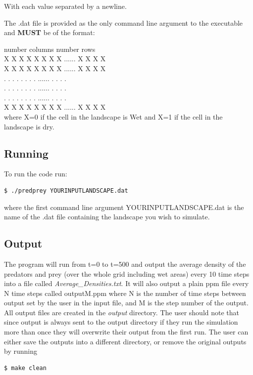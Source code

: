 With each value separated by a newline.

The .dat file is provided as the only command line argument to the executable and \textbf{MUST} be of the format:

number columns number rows      \\
X X X X X X X X ...... X X X X  \\
X X X X X X X X ...... X X X X  \\
. . . . . . . . ...... . . . .  \\
. . . . . . . . ...... . . . .  \\
. . . . . . . . ...... . . . .  \\
X X X X X X X X ...... X X X X  \\

where X=0 if the cell in the landscape is Wet and X=1 if the cell in the landscape is dry. 


\subsection{Running}
To run the code run:
\begin{lstlisting}[language=bash]
$ ./predprey YOURINPUTLANDSCAPE.dat

\end{lstlisting}
where the first command line argument YOURINPUTLANDSCAPE.dat is the name of the .dat file containing the landscape you wish to simulate. 

\subsection{Output}
The program will run from t=0 to t=500 and output the average density of the predators and prey (over the whole grid including wet areas) every 10 time steps into a file called \textit{Average\_Densities.txt}. It will also output a plain ppm file every N time steps called outputM.ppm where N is the number of time steps between output set by the user in the input file, and M is the step number of the output. All output files are created in the \textit{output} directory. The user should note that since output is always sent to the output directory if they run the simulation more than once they will overwrite their output from the first run. The user can either save the outputs into a different directory, or remove the original outputs by running 
\begin{lstlisting}[language=bash]
$ make clean
\end{lstlisting}

